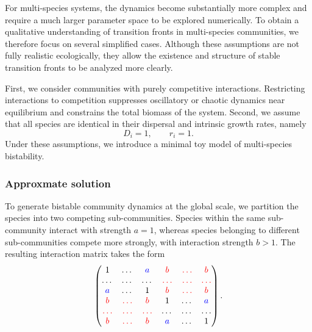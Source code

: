 For multi-species systems, the dynamics become substantially more complex and require a much larger parameter space to be explored numerically. To obtain a qualitative understanding of transition fronts in multi-species communities, we therefore focus on several simplified cases. Although these assumptions are not fully realistic ecologically, they allow the existence and structure of stable transition fronts to be analyzed more clearly.

First, we consider communities with purely competitive interactions. Restricting interactions to competition suppresses oscillatory or chaotic dynamics near equilibrium and constrains the total biomass of the system. Second, we assume that all species are identical in their dispersal and intrinsic growth rates, namely
\begin{equation*}
    D_i = 1,
    \qquad
    r_i = 1.
\end{equation*}
Under these assumptions, we introduce a minimal toy model of multi-species bistability.

\subsubsection{Approxmate solution}

To generate bistable community dynamics at the global scale, we partition the species into two competing sub-communities. Species within the same sub-community interact with strength $a=1$, whereas species belonging to different sub-communities compete more strongly, with interaction strength $b>1$. The resulting interaction matrix takes the form
\begin{equation*}
    \begin{pmatrix}
        1       &\dots&\textcolor{blue}{a}      &\textcolor{red}{b}   &\textcolor{red}{\dots}  &\textcolor{red}{b}  \\
        \dots   &\dots&\dots                    &\textcolor{red}{\dots}  &\textcolor{red}{\dots}  &\textcolor{red}{\dots}  \\
        \textcolor{blue}{a}&\dots&1             &\textcolor{red}{b}   &\textcolor{red}{\dots}  &\textcolor{red}{b}  \\
        \textcolor{red}{b}&\textcolor{red}{\dots} &\textcolor{red}{b}  &1    &\dots&\textcolor{blue}{a}  \\
        \textcolor{red}{\dots}  &\textcolor{red}{\dots}  &\textcolor{red}{\dots}
        &\dots   &\dots &\dots  \\
        \textcolor{red}{b}&\textcolor{red}{\dots} &\textcolor{red}{b}  &\textcolor{blue}{a}   &\dots&1
    \end{pmatrix}.
\end{equation*}

